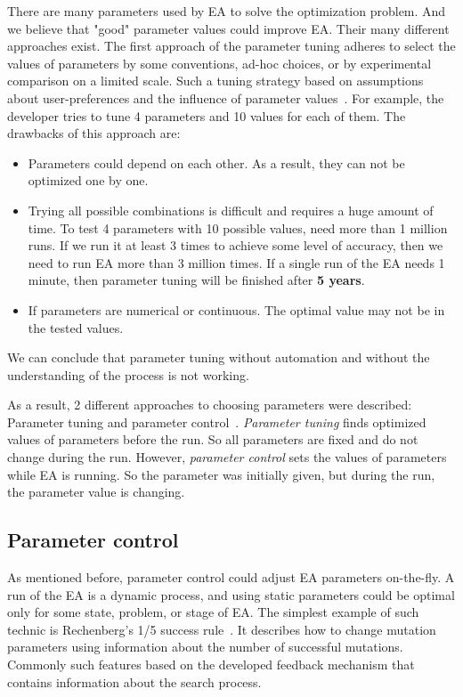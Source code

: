 There are many parameters used by EA to solve the optimization problem. And we believe that "good" parameter values could improve EA. Their many different approaches exist. 
The first approach of the parameter tuning adheres to select the values of parameters by some conventions, ad-hoc choices, or by experimental comparison on a limited scale. Such a tuning strategy based on assumptions about user-preferences and the influence of parameter values~\cite{eiben03,eiben11}. For example, the developer tries to tune 4 parameters and 10 values for each of them.
The drawbacks of this approach are:
\begin{itemize}
	\item Parameters could depend on each other. As a result, they can not be optimized one by one.
	\item Trying all possible combinations is difficult and requires a huge amount of time. To test 4 parameters with 10 possible values, need more than 1 million runs. If we run it at least 3 times to achieve some level of accuracy, then we need to run EA more than 3 million times. If a single run of the EA needs 1 minute, then parameter tuning will be finished after \textbf{5 years}. 
	\item If parameters are numerical or continuous. The optimal value may not be in the tested values.
\end{itemize}

We can conclude that parameter tuning without automation and without the understanding of the process is not working.

As a result, 2 different approaches to choosing parameters were described: Parameter tuning and parameter control~\cite{smit2012parameter,eiben03}.
\textit{Parameter tuning} finds optimized values of parameters before the run. So all parameters are fixed and do not change during the run. However, \textit{parameter control} sets the values of parameters while EA is running. So the parameter was initially given, but during the run, the parameter value is changing. 

\subsection{Parameter control}
As mentioned before, parameter control could adjust EA parameters on-the-fly. A run of the EA is a dynamic process, and using static parameters could be optimal only for some state, problem, or stage of EA. 
The simplest example of such technic is Rechenberg's 1/5 success rule~\cite{rechenberg1973evolutionsstrategie}. It describes how to change mutation parameters using information about the number of successful mutations. Commonly such features based on the developed feedback mechanism that contains information about the search process.


